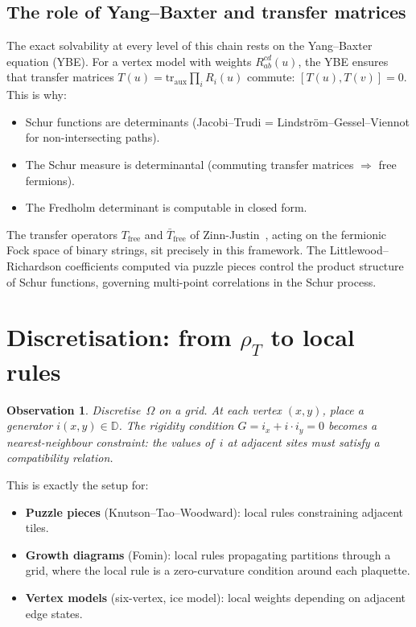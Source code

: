 \documentclass[11pt]{article}
\newcommand{\D}{\mathbb{D}}
\newcommand{\rhoT}{\rho_T}
\theoremstyle{plain}
\newtheorem{observation}{Observation}
\theoremstyle{definition}
\theoremstyle{remark}
\begin{document}
\subsection{The role of Yang--Baxter and transfer matrices}

The exact solvability at every level of this chain rests on the
Yang--Baxter equation (YBE). For a vertex model with weights
$R_{ab}^{cd}(u)$, the YBE ensures that transfer matrices
$T(u) = \mathrm{tr}_{\mathrm{aux}}\prod_i R_i(u)$ commute:
$[T(u),T(v)]=0$. This is why:
\begin{itemize}
  \item Schur functions are determinants (Jacobi--Trudi =
    Lindstr\"om--Gessel--Viennot for non-intersecting paths).
  \item The Schur measure is determinantal (commuting transfer
    matrices $\Rightarrow$ free fermions).
  \item The Fredholm determinant is computable in closed form.
\end{itemize}

The transfer operators $T_{\mathrm{free}}$ and
$\bar{T}_{\mathrm{free}}$ of Zinn-Justin~\cite{ZJ2008}, acting on
the fermionic Fock space of binary strings, sit precisely in this
framework. The Littlewood--Richardson coefficients computed via
puzzle pieces control the product structure of Schur functions,
governing multi-point correlations in the Schur process.

\section{Discretisation: from $\rhoT$ to local rules}
\label{sec:discretisation}

\begin{observation}
Discretise~$\Omega$ on a grid. At each vertex $(x,y)$, place a
generator $i(x,y)\in\D$. The rigidity condition $G=i_x+i\cdot i_y=0$
becomes a \emph{nearest-neighbour constraint}: the values of~$i$ at
adjacent sites must satisfy a compatibility relation.
\end{observation}

This is exactly the setup for:
\begin{itemize}
  \item \textbf{Puzzle pieces} (Knutson--Tao--Woodward): local rules
    constraining adjacent tiles.
  \item \textbf{Growth diagrams} (Fomin): local rules propagating
    partitions through a grid, where the local rule is a
    zero-curvature condition around each plaquette.
  \item \textbf{Vertex models} (six-vertex, ice model): local weights
    depending on adjacent edge states.
\end{itemize}
\end{document}
